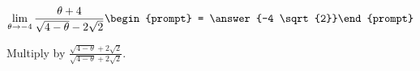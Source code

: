\documentclass{ximera}
\author{Bart Snapp}
\begin{document}
\begin{exercise}

\[
\lim_{\theta\to -4 } \frac{\theta +4}{\sqrt{4-\theta }-2 \sqrt{2}}\begin{prompt} = \answer{-4 \sqrt{2}}\end{prompt}
\]
\begin{hint}
Multiply by $\frac{\sqrt{4-\theta }+2 \sqrt{2}}{\sqrt{4-\theta }+2 \sqrt{2}}$.
\end{hint}
\end{exercise}
\end{document}

